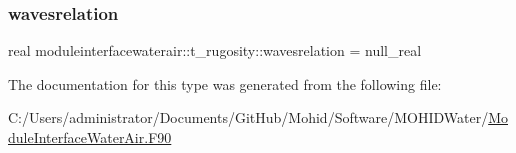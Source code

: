 \subsubsection{\texorpdfstring{wavesrelation}{wavesrelation}}
{\footnotesize\ttfamily real moduleinterfacewaterair\+::t\+\_\+rugosity\+::wavesrelation = null\+\_\+real\hspace{0.3cm}{\ttfamily [private]}}



The documentation for this type was generated from the following file\+:\begin{DoxyCompactItemize}
\item 
C\+:/\+Users/administrator/\+Documents/\+Git\+Hub/\+Mohid/\+Software/\+M\+O\+H\+I\+D\+Water/\mbox{\hyperlink{_module_interface_water_air_8_f90}{Module\+Interface\+Water\+Air.\+F90}}\end{DoxyCompactItemize}
